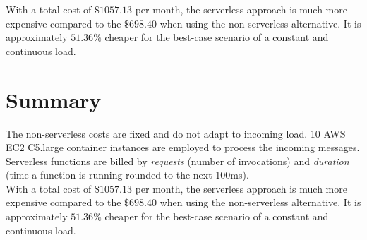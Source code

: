 With a total cost of $\$1057.13$ per month, the serverless approach is much more expensive compared to the $\$698.40$ when using the non-serverless alternative. It is approximately $51.36\%$ cheaper for the best-case scenario of a constant and continuous load. 

\section{Summary}

The non-serverless costs are fixed and do not adapt to incoming load. 10 AWS EC2 C5.large container instances are employed to process the incoming messages.\\
Serverless functions are billed by \textit{requests} (number of invocations) and \textit{duration} (time a  function is running rounded to the next 100ms).\\
With a total cost of $\$1057.13$ per month, the serverless approach is much more expensive compared to the $\$698.40$ when using the non-serverless alternative. It is approximately $51.36\%$ cheaper for the best-case scenario of a constant and continuous load. 